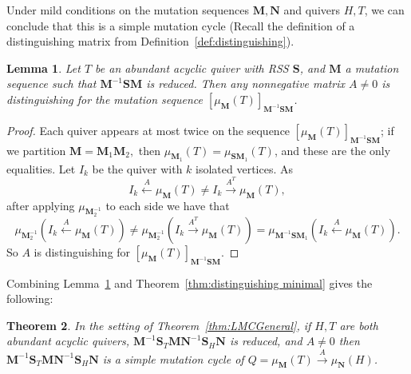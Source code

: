 \documentclass[11pt, letterpaper]{amsart}
\newcommand{\cS}[1]{{\noindent\textsf{\color{purple}$\blacksquare$~#1~$\blacksquare$}}}
\newtheorem{theorem}{Theorem}[section]
\newtheorem{lemma}[theorem]{Lemma}
\theoremstyle{definition}
\numberwithin{equation}{section}
\begin{document}
Under mild conditions on the mutation sequences $\mathbf M, \mathbf N$ and quivers $H,T$, we can conclude that this is a simple mutation cycle
(Recall the definition of a distinguishing matrix from Definition~\ref{def:distinguishing}).

\begin{lemma}
\label{lem:PositiveDistinguishingLMC}
Let $T$ be an abundant acyclic quiver %
with RSS $\mathbf S$, and $\mathbf{M}$ a mutation sequence such that $\mathbf M^{-1} \mathbf S \mathbf M$ is reduced.
Then any nonnegative matrix $A \neq 0$ is distinguishing for the mutation sequence $[\mu_{\mathbf M}(T)]_{\mathbf M^{-1} \mathbf S \mathbf M}$.
\end{lemma}

\begin{proof}
Each quiver appears at most twice on the sequence $[\mu_{\mathbf M}(T)]_{\mathbf M^{-1} \mathbf S \mathbf M}$; if we partition $\mathbf M = \mathbf M_1 \mathbf M_2,$ then $\mu_{\mathbf M_1}(T) = \mu_{\mathbf S \mathbf M_1}(T)$, and these are the only equalities. %
Let $I_k$ be the quiver with $k$ isolated vertices.
As 
$$I_k \stackrel{A}{\leftarrow} \mu_{\mathbf M}(T) \neq I_k \stackrel{A^T}{\rightarrow} \mu_{\mathbf M}(T),$$ after applying $\mu_{\mathbf M_2^{-1}}$ to each side we have that 
$$\mu_{\mathbf M_2^{-1}}(I_k \stackrel{A}{\leftarrow} \mu_{\mathbf M}(T)) \neq \mu_{\mathbf M_2^{-1}}(I_k \stackrel{A^T}{\rightarrow} \mu_{\mathbf M}(T)) = \mu_{\mathbf M^{-1} \mathbf S \mathbf M_1}(I_k \stackrel{A}{\leftarrow} \mu_{\mathbf M}(T)).$$
So $A$ is distinguishing for $[\mu_{\mathbf M}(T)]_{\mathbf M^{-1} \mathbf S \mathbf M}$. %
\end{proof}

Combining Lemma~\ref{lem:PositiveDistinguishingLMC} and Theorem~\ref{thm:distinguishing minimal} gives the following:

\begin{theorem}
\label{thm:GeneralizedLMCcycle}
In the setting of Theorem~\ref{thm:LMCGeneral}, if $H,T$ are both abundant acyclic quivers, $\mathbf M^{-1}\mathbf S_T \mathbf M \mathbf N^{-1} \mathbf S_H \mathbf N$ is reduced, and $A \neq 0$ then $\mathbf M^{-1}\mathbf S_T \mathbf M \mathbf N^{-1} \mathbf S_H \mathbf N$ is a simple mutation cycle of $Q = {\mu_{\mathbf M}(T) \stackrel{A}\rightarrow \mu_{\mathbf N}(H)}$.
\end{theorem}
\end{document}
